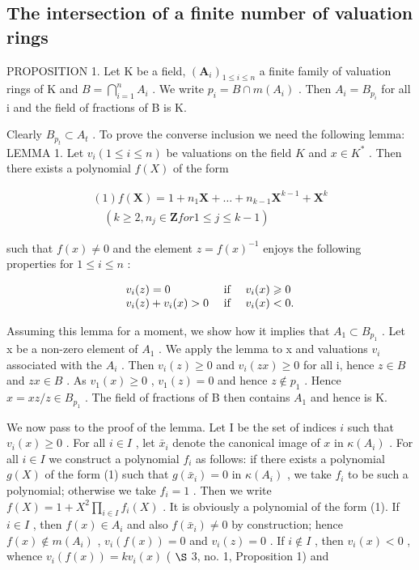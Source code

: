 \subsection{The intersection of a finite number of valuation rings}

PROPOSITION 1. Let K be a field, \((\mathbf{A}_{i})_{1 \leqslant i \leqslant n}\) a finite family of valuation rings of K and \(B = \bigcap_{i=1}^{n} A_{i}\) . We write \(p_{i} = B \cap m(A_{i})\) . Then \(A_{i} = B_{p_{i}}\) for all i and the field of fractions of B is K.

Clearly \(B_{p_t} \subset A_t\) . To prove the converse inclusion we need the following lemma: LEMMA 1. Let \(v_i (1 \leqslant i \leqslant n)\) be valuations on the field \(K\) and \(x \in K^*\) . Then there exists a polynomial \(f(X)\) of the form

\[
\begin{array}{l} (1) f (\mathbf {X}) = 1 + n _ {1} \mathbf {X} + \dots + n _ {k - 1} \mathbf {X} ^ {k - 1} + \mathbf {X} ^ {k} \\ \quad (k \geqslant 2, n _ {j} \in \mathbf {Z} for 1 \leqslant j \leqslant k - 1) \end{array}
\]

such that \(f(x) \neq 0\) and the element \(z = f(x)^{-1}\) enjoys the following properties for \(1 \leqslant i \leqslant n\) :

\[
\begin{array}{l l} v _ {i} (z) = 0 & \text { if } \quad v _ {i} (x) \geqslant 0 \\ v _ {i} (z) + v _ {i} (x) > 0 & \text { if } \quad v _ {i} (x) <   0. \end{array}
\]

Assuming this lemma for a moment, we show how it implies that \(A_{1} \subset B_{p_{1}}\) . Let x be a non-zero element of \(A_{1}\) . We apply the lemma to x and valuations \(v_{i}\) associated with the \(A_{i}\) . Then \(v_{i}(z) \geqslant 0\) and \(v_{i}(zx) \geqslant 0\) for all i, hence \(z \in B\) and \(zx \in B\) . As \(v_{1}(x) \geqslant 0\) , \(v_{1}(z) = 0\) and hence \(z \notin p_{1}\) . Hence \(x = xz/z \in B_{p_{1}}\) . The field of fractions of B then contains \(A_{1}\) and hence is K.

We now pass to the proof of the lemma. Let I be the set of indices \(i\) such that \(v_{i}(x) \geqslant 0\) . For all \(i \in I\) , let \(\bar{x}_{i}\) denote the canonical image of \(x\) in \(\kappa(A_{i})\) . For all \(i \in I\) we construct a polynomial \(f_{i}\) as follows: if there exists a polynomial \(g(X)\) of the form (1) such that \(g(\bar{x}_{i}) = 0\) in \(\kappa(A_{i})\) , we take \(f_{i}\) to be such a polynomial; otherwise we take \(f_{i} = 1\) . Then we write \(f(X) = 1 + X^{2} \prod_{i \in I} f_{i}(X)\) . It is obviously a polynomial of the form (1). If \(i \in I\) , then \(f(x) \in A_{i}\) and also \(f(\bar{x}_{i}) \neq 0\) by construction; hence \(f(x) \notin m(A_{i})\) , \(v_{i}(f(x)) = 0\) and \(v_{i}(z) = 0\) . If \(i \notin I\) , then \(v_{i}(x) < 0\) , whence \(v_{i}(f(x)) = kv_{i}(x)\) ( \(\S\) 3, no. 1, Proposition 1) and

